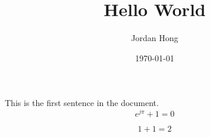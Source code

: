 \documentclass[letter]{article}
\title{Hello World}
\author{Jordan Hong}
\date{\today}
\begin{document}
\maketitle
This is the first sentence in the document. 
\begin{equation}
    e^{j\pi} + 1 =0 
    \label{eqn:euler}
\end{equation}

\begin{equation}
    1 + 1 = 2
    \label{eqn:simple}
\end{equation}
\end{document}
